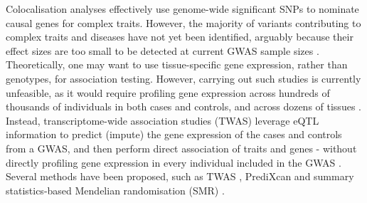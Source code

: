 Colocalisation analyses effectively use genome-wide significant SNPs to nominate causal genes for complex traits. 
However, the majority of variants contributing to complex traits and diseases have not yet been identified, arguably because their effect sizes are too small to be detected at current GWAS sample sizes \cite{visscher201710}.
Theoretically, one may want to 
use tissue-specific gene expression, rather than genotypes, for association testing.
However, carrying out such studies is currently unfeasible, as it would require profiling gene expression across hundreds of thousands of individuals in both cases and controls, and across dozens of tissues \cite{cano2020gwas}.
Instead,
transcriptome-wide association studies (TWAS) leverage eQTL information to predict (impute) the gene expression of the cases and controls from a GWAS, and then perform direct association of traits and genes - without directly profiling gene expression in every individual included in the GWAS \cite{wainberg2019opportunities}.
Several methods have been proposed, such as TWAS \cite{gusev2016integrative}, PrediXcan \cite{gamazon2015gene} and summary statistics-based Mendelian randomisation (SMR) \cite{zhu2016integration}.
\\



%  


